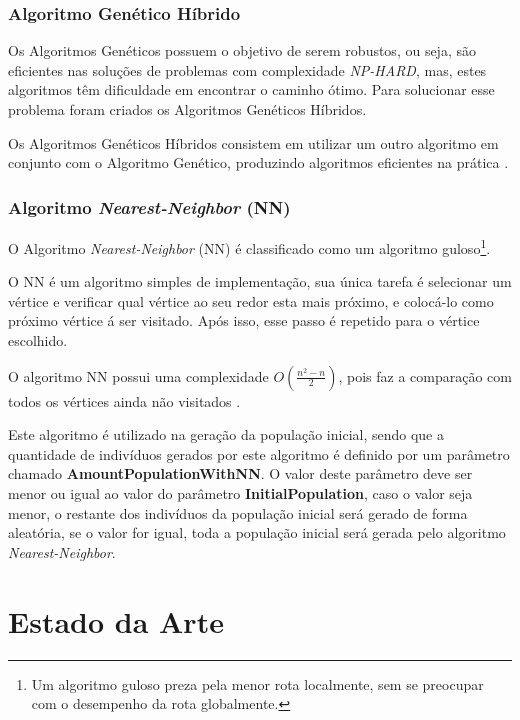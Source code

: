 \documentclass[12pt,openright,a4paper,oneside]{tcc}
\begin{document}
		\subsection{Algoritmo Genético Híbrido}

			Os Algoritmos Genéticos possuem o objetivo de serem robustos, ou seja, são eficientes nas soluções de problemas com complexidade \textit{NP-HARD}, mas, estes algoritmos têm dificuldade em encontrar o caminho ótimo. Para solucionar esse problema foram criados os Algoritmos Genéticos Híbridos.

			Os Algoritmos Genéticos Híbridos consistem em utilizar um outro algoritmo em conjunto com o Algoritmo Genético, produzindo algoritmos eficientes na prática \cite{TravelingTheory}.

        \subsection{Algoritmo \textit{Nearest-Neighbor} (NN)}

            O Algoritmo \textit{Nearest-Neighbor} (NN) é classificado como um algoritmo guloso\footnote{Um algoritmo guloso preza pela menor rota localmente, sem se preocupar com o desempenho da rota globalmente.}.

            O NN é um algoritmo simples de implementação, sua única tarefa é selecionar um vértice e verificar qual vértice ao seu redor esta mais próximo, e colocá-lo como próximo vértice á ser visitado. Após isso, esse passo é repetido para o vértice escolhido. 

            O algoritmo NN possui uma complexidade $O(\frac{n^2-n}{2})$, pois faz a comparação com todos os vértices ainda não visitados \cite{NN}.

            Este algoritmo é utilizado na geração da população inicial, sendo que a quantidade de indivíduos gerados por este algoritmo é definido por um parâmetro chamado \textbf{AmountPopulationWithNN}. O valor deste parâmetro deve ser menor ou igual ao valor do parâmetro \textbf{InitialPopulation}, caso o valor seja menor, o restante dos indivíduos da população inicial será gerado de forma aleatória, se o valor for igual, toda a população inicial será gerada pelo algoritmo \textit{Nearest-Neighbor}.  
			
		\chapter{Estado da Arte}
		
\end{document}
